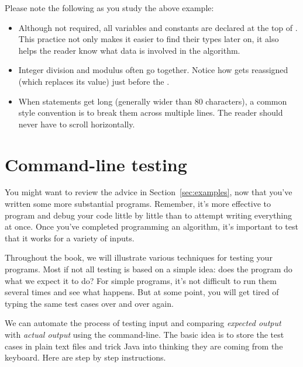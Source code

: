 Please note the following as you study the above example:

\begin{itemize}

\item Although not required, all variables and constants are declared at the top of .
This practice not only makes it easier to find their types later on, it also helps the reader know what data is involved in the algorithm.

\item Integer division and modulus often go together.
Notice how  gets reassigned (which replaces its value) just before the .

\item When statements get long (generally wider than 80 characters), a common style convention is to break them across multiple lines.
The reader should never have to scroll horizontally.

\end{itemize}



\section{Command-line testing}

You might want to review the advice in Section~\ref{sec:examples}, now that you've written some more substantial programs.
Remember, it's more effective to program and debug your code little by little than to attempt writing everything at once.
Once you've completed programming an algorithm, it's important to test that it works for a variety of inputs.

Throughout the book, we will illustrate various techniques for testing your programs.
Most if not all testing is based on a simple idea: does the program do what we expect it to do?
For simple programs, it's not difficult to run them several times and see what happens.
But at some point, you will get tired of typing the same test cases over and over again.

We can automate the process of testing input and comparing {\em expected output} with {\em actual output} using the command-line.
The basic idea is to store the test cases in plain text files and trick Java into thinking they are coming from the keyboard.
Here are step by step instructions.


